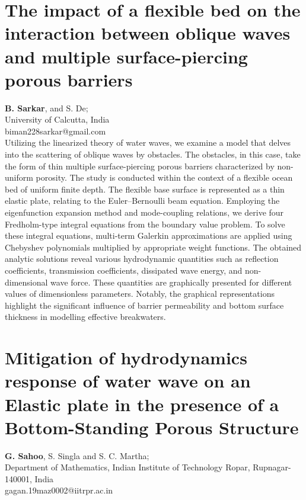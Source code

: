 \documentclass[9pt,a4paper,oneside]{book}
\numberwithin{equation}{section}
\begin{document}
\section*{The impact of a flexible bed on the interaction between oblique waves and multiple surface-piercing porous barriers}
 \label{abs:20}
  {\bf B. Sarkar}, and S. De;\\
University of Calcutta, India\\
biman228sarkar@gmail.com\\

Utilizing the linearized theory of water waves, we examine a model that delves into the scattering of oblique waves by obstacles. The obstacles, in this case, take the form of thin multiple surface-piercing porous barriers characterized by non-uniform porosity. The study is conducted within the context of a flexible ocean bed of uniform finite depth. The flexible base surface is represented as a thin elastic plate, relating to the Euler–Bernoulli beam equation. Employing the eigenfunction expansion method and mode-coupling relations, we derive four Fredholm-type integral equations from the boundary value problem. To solve these integral equations, multi-term Galerkin approximations are applied using Chebyshev polynomials multiplied by appropriate weight functions. The obtained analytic solutions reveal various hydrodynamic quantities such as reflection coefficients, transmission coefficients, dissipated wave energy, and non-dimensional wave force. These quantities are graphically presented for different values of dimensionless parameters. Notably, the graphical representations highlight the significant influence of barrier permeability and bottom surface thickness in modelling effective breakwaters.

\section*{Mitigation of hydrodynamics response of water wave on an Elastic plate in the presence of a Bottom-Standing Porous Structure}
 \label{abs:21}
  {\bf G. Sahoo}, S. Singla and S. C. Martha;\\
Department of Mathematics, Indian Institute of Technology Ropar, Rupnagar-140001, India\\
gagan.19maz0002@iitrpr.ac.in\\
\end{document}
